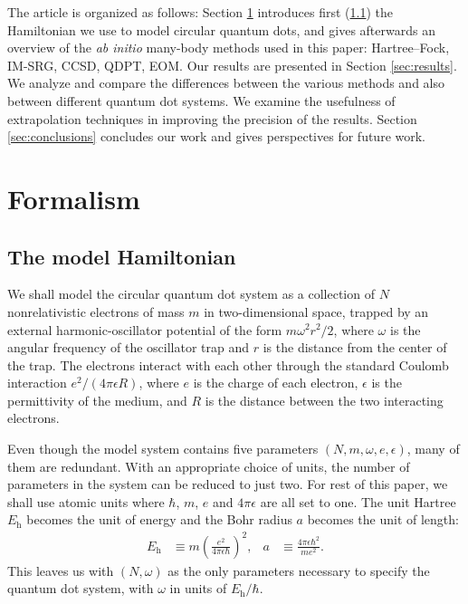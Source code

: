 The article is organized as follows: Section \ref{sec:formalism} introduces first (\ref{subsec:modelHamiltonian}) the Hamiltonian we use to model circular quantum dots, and gives afterwards an overview of the \textit{ab initio} many-body methods used in this paper: Hartree--Fock, IM-SRG, CCSD, QDPT, EOM.  Our results are presented in Section \ref{sec:results}.  We analyze and compare the differences between the various methods and also between different quantum dot systems.  We examine the usefulness of extrapolation techniques in improving the precision of the results.  Section \ref{sec:conclusions} concludes our work and gives perspectives for future work.

\section{Formalism}
\label{sec:formalism}

\subsection{The model Hamiltonian}
\label{subsec:modelHamiltonian}

We shall model the circular quantum dot system as a collection of $N$ nonrelativistic electrons of mass $m$ in two-dimensional space, trapped by an external harmonic-oscillator potential of the form $m \omega^2r^2 / 2$, where $\omega$ is the angular frequency of the oscillator trap and $r$ is the distance from the center of the trap.  The electrons interact with each other through the standard Coulomb interaction $e^2 / (4 \pi \epsilon R)$, where $e$ is the charge of each electron, $\epsilon$ is the permittivity of the medium, and $R$ is the distance between the two interacting electrons.

Even though the model system contains five parameters $(N, m, \omega, e, \epsilon)$, many of them are redundant.  With an appropriate choice of units, the number of parameters in the system can be reduced to just two.  For rest of this paper, we shall use atomic units where $\hbar$, $m$, $e$ and $4 \pi \epsilon$ are all set to one.  The unit Hartree $E_{\mathrm{h}}$ becomes the unit of energy and the Bohr radius $a$ becomes the unit of length:
\begin{align*}
  E_{\mathrm{h}} &\equiv m \left(\frac{e^2}{4 \pi \epsilon \hbar}\right)^2, &
  a &\equiv \frac{4 \pi \epsilon \hbar^2}{m e^2}.
\end{align*}
This leaves us with $(N, \omega)$ as the only parameters necessary to specify the quantum dot system, with $\omega$ in units of $E_{\mathrm{h}} / \hbar$.

